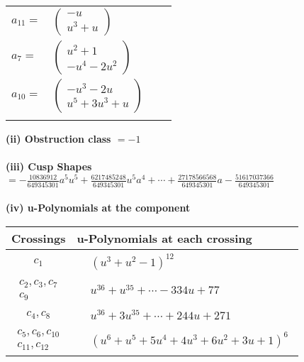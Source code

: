 \documentclass[1p]{elsarticle_modified}
\theoremstyle{definition}
\begin{document}
\begin{tabular}{m{7pt} m{180pt} m{7pt} m{180pt} }
\flushright $a_{11}=$&$\begin{pmatrix}- u\\u^3+u\end{pmatrix}$ \\
\flushright $a_{7}=$&$\begin{pmatrix}u^2+1\\- u^4-2 u^2\end{pmatrix}$ \\
\flushright $a_{10}=$&$\begin{pmatrix}- u^3-2 u\\u^5+3 u^3+u\end{pmatrix}$\\&\end{tabular}
\flushleft \textbf{(ii) Obstruction class $= -1$}\\~\\
\flushleft \textbf{(iii) Cusp Shapes $= -\frac{10836912}{649345301} a^5 u^5+\frac{6217485248}{649345301} u^5 a^4+\cdots+\frac{27178566568}{649345301} a-\frac{51617037366}{649345301}$}\\~\\
\newpage\renewcommand{\arraystretch}{1}
\flushleft \textbf{(iv) u-Polynomials at the component}\newline \\
\begin{tabular}{m{50pt}|m{274pt}}
Crossings & \hspace{64pt}u-Polynomials at each crossing \\
\hline $$\begin{aligned}c_{1}\end{aligned}$$&$\begin{aligned}
&(u^3+u^2-1)^{12}
\end{aligned}$\\
\hline $$\begin{aligned}c_{2},c_{3},c_{7}\\c_{9}\end{aligned}$$&$\begin{aligned}
&u^{36}+u^{35}+\cdots-334 u+77
\end{aligned}$\\
\hline $$\begin{aligned}c_{4},c_{8}\end{aligned}$$&$\begin{aligned}
&u^{36}+3 u^{35}+\cdots+244 u+271
\end{aligned}$\\
\hline $$\begin{aligned}c_{5},c_{6},c_{10}\\c_{11},c_{12}\end{aligned}$$&$\begin{aligned}
&(u^6+u^5+5 u^4+4 u^3+6 u^2+3 u+1)^6
\end{aligned}$\\
\hline
\end{tabular}\\~\\
\end{document}
